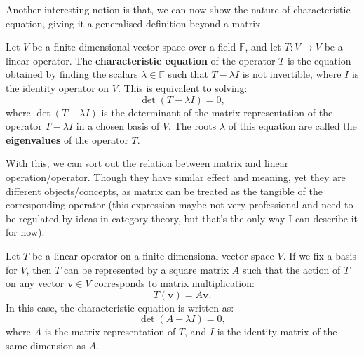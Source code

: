 \documentclass[12pt,a4paper]{article}
\begin{document}
Another interesting notion is that, we can now show the nature of characteristic equation, giving it a generalised definition beyond a matrix.


\begin{definition}
Let \( V \) be a finite-dimensional vector space over a field \( \mathbb{F} \), and let \( T: V \to V \) be a linear operator. The \textbf{characteristic equation} of the operator \( T \) is the equation obtained by finding the scalars \( \lambda \in \mathbb{F} \) such that \( T - \lambda I \) is not invertible, where \( I \) is the identity operator on \( V \). This is equivalent to solving:
\[
\det(T - \lambda I) = 0,
\]
where \( \det(T - \lambda I) \) is the determinant of the matrix representation of the operator \( T - \lambda I \) in a chosen basis of \( V \). The roots \( \lambda \) of this equation are called the \textbf{eigenvalues} of the operator \( T \).
\end{definition}

With this, we can sort out the relation between matrix and linear operation/operator. Though they have similar effect and meaning, yet they are different objects/concepts, as matrix can be treated as the tangible of the corresponding operator (this expression maybe not very professional and need to be regulated by ideas in category theory, but that's the only way I can describe it for now).

\begin{definition}
Let \( T \) be a linear operator on a finite-dimensional vector space \( V \). If we fix a basis for \( V \), then \( T \) can be represented by a square matrix \( A \) such that the action of \( T \) on any vector \( \mathbf{v} \in V \) corresponds to matrix multiplication:
\[
T(\mathbf{v}) = A \mathbf{v}.
\]
In this case, the characteristic equation is written as:
\[
\det(A - \lambda I) = 0,
\]
where \( A \) is the matrix representation of \( T \), and \( I \) is the identity matrix of the same dimension as \( A \).
\end{definition}
\end{document}
